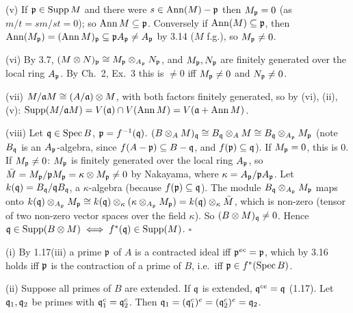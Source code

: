 \documentclass[11pt]{article}
\begin{document}
(v) If $\mathfrak p\in\operatorname{Supp} M$ and there were $s\in\operatorname{Ann}(M)-\mathfrak p$ then $M_\mathfrak p=0$ (as $m/t=sm/st=0$); so $\operatorname{Ann} M\subseteq\mathfrak p$. Conversely if $\operatorname{Ann}(M)\subseteq\mathfrak p$, then $\operatorname{Ann}(M_\mathfrak p)=(\operatorname{Ann} M)_\mathfrak p\subseteq\mathfrak p A_\mathfrak p\ne A_\mathfrak p$ by 3.14 ($M$ f.g.), so $M_\mathfrak p\ne0$.

(vi) By 3.7, $(M\otimes N)_\mathfrak p\cong M_\mathfrak p\otimes_{A_\mathfrak p}N_\mathfrak p$, and $M_\mathfrak p,N_\mathfrak p$ are finitely generated over the local ring $A_\mathfrak p$. By Ch.~2, Ex.~3 this is $\ne0$ iff $M_\mathfrak p\ne0$ and $N_\mathfrak p\ne0$.

(vii) $M/\mathfrak a M\cong(A/\mathfrak a)\otimes M$, with both factors finitely generated, so by (vi), (ii), (v): $\operatorname{Supp}(M/\mathfrak a M)=V(\mathfrak a)\cap V(\operatorname{Ann} M)=V(\mathfrak a+\operatorname{Ann} M)$.

(viii) Let $\mathfrak q\in\operatorname{Spec} B$, $\mathfrak p=f^{-1}(\mathfrak q)$. $(B\otimes_AM)_\mathfrak q\cong B_\mathfrak q\otimes_AM\cong B_\mathfrak q\otimes_{A_\mathfrak p}M_\mathfrak p$ (note $B_\mathfrak q$ is an $A_\mathfrak p$-algebra, since $f(A-\mathfrak p)\subseteq B-\mathfrak q$, and $f(\mathfrak p)\subseteq\mathfrak q$). If $M_\mathfrak p=0$, this is $0$. If $M_\mathfrak p\ne0$: $M_\mathfrak p$ is finitely generated over the local ring $A_\mathfrak p$, so $\bar M=M_\mathfrak p/\mathfrak p M_\mathfrak p=\kappa\otimes M_\mathfrak p\ne0$ by Nakayama, where $\kappa=A_\mathfrak p/\mathfrak p A_\mathfrak p$. Let $k(\mathfrak q)=B_\mathfrak q/\mathfrak q B_\mathfrak q$, a $\kappa$-algebra (because $f(\mathfrak p)\subseteq\mathfrak q$). The module $B_\mathfrak q\otimes_{A_\mathfrak p}M_\mathfrak p$ maps onto $k(\mathfrak q)\otimes_{A_\mathfrak p}M_\mathfrak p\cong k(\mathfrak q)\otimes_\kappa(\kappa\otimes_{A_\mathfrak p}M_\mathfrak p)=k(\mathfrak q)\otimes_\kappa\bar M$, which is non-zero (tensor of two non-zero vector spaces over the field $\kappa$). So $(B\otimes M)_\mathfrak q\ne0$. Hence $\mathfrak q\in\operatorname{Supp}(B\otimes M)\iff f^*(\mathfrak q)\in\operatorname{Supp}(M)$. \hfill$\square$

\pf
(i) By 1.17(iii) a prime $\mathfrak p$ of $A$ is a contracted ideal iff $\mathfrak p^{ec}=\mathfrak p$, which by 3.16 holds iff $\mathfrak p$ is the contraction of a prime of $B$, i.e.\ iff $\mathfrak p\in f^*(\operatorname{Spec} B)$.

(ii) Suppose all primes of $B$ are extended. If $\mathfrak q$ is extended, $\mathfrak q^{ce}=\mathfrak q$ (1.17). Let $\mathfrak q_1,\mathfrak q_2$ be primes with $\mathfrak q_1^c=\mathfrak q_2^c$. Then $\mathfrak q_1=(\mathfrak q_1^c)^e=(\mathfrak q_2^c)^e=\mathfrak q_2$.
\end{document}
